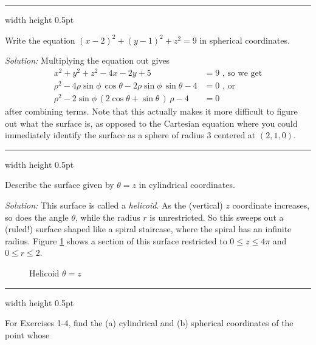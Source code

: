 \vspace{2mm}
\hrule width \textwidth height 0.5pt
\begin{exmp}
 Write the equation $(x - 2)^2 + (y - 1)^2 + z^2 = 9$ in spherical coordinates.\vspace{1mm}
 \par\noindent \emph{Solution:} Multiplying the equation out gives
 \begin{align*}
  x^2 + y^2 + z^2 - 4x - 2y + 5 &= 9 \text{~, so we get}\\
  \rho^2 - 4 \rho \sin \phi \,\cos \theta - 2 \rho \sin \phi \,\sin \theta - 4 &= 0 \text{~,~or}\\
  \rho^2 - 2 \sin \phi \, ( 2 \cos \theta + \sin \theta \, ) \,\rho - 4 &= 0
 \end{align*}
 after combining terms. Note that this actually makes it more difficult to figure out what the surface is,
 as opposed to the Cartesian equation where you could immediately identify the surface as a sphere of radius $3$ centered
 at $(2,1,0)$.
\end{exmp}
\hrule width \textwidth height 0.5pt
\begin{exmp}\label{exmp:helicoid}
 Describe the surface given by $\theta = z$ in cylindrical coordinates.\vspace{1mm}
 \par\noindent \emph{Solution:} This surface is called a \emph{helicoid}. As the (vertical) $z$
 coordinate increases, so does the angle $\theta$, while the radius $r$ is unrestricted. So this sweeps out a (ruled!)
 surface shaped like a spiral staircase, where the spiral has an infinite radius. Figure \ref{fig:helicoid} shows a
 section of this surface restricted to $0 \le z \le 4\pi$ and $0 \le r \le 2$.\vspace{-20mm}
 \begin{figure}[h]
  \begin{center}
   
  \end{center}\vspace{-12mm}
 \caption[]{\quad Helicoid $\theta = z$}
 \label{fig:helicoid}
 \end{figure}
\end{exmp}\vspace{-4mm}
\hrule width \textwidth height 0.5pt
\newpage
\centerline{}\label{sec1dot7}
\par\noindent For Exercises 1-4, find the (a) cylindrical and (b) spherical coordinates of the point whose
